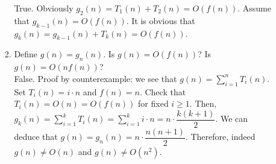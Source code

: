 \documentclass[11pt]{article}
\begin{document}
\begin{enumerate}
\begin{enumerate}
\begin{enumerate}
True. Obviously $g_2 (n) = T_1 (n) + T_2 (n) = O(f(n))$. Assume that $g_{k-1} (n) = O(f(n))$. It is obvious that $g_{k} (n) = g_{k-1} (n) + T_{k} (n) = O(f(n))$.
\item Define $g(n) = g_n (n)$. Is $g(n) = O(f(n))$? Is $g(n) = O(nf(n))$?\\
False. Proof by counterexample: we see that $g(n) = \sum_{i=1}^{n} T_i (n)$. Set $T_i (n) = i \cdot n$ and $f(n) = n$. Check that $T_i (n) = O(n) = O(f(n))$ for fixed $i \geq 1$. Then, $g_k (n) = \sum_{i=1}^{k} T_i (n) = \sum_{i=1}^{k} i \cdot n = n \cdot \dfrac{k(k+1)}{2}$. We can deduce that $g(n) = g_n (n) = n \cdot \dfrac{n(n+1)}{2}$. Therefore, indeed $g(n) \neq O(n)$ and $g(n) \neq O(n^2)$. 
\end{enumerate}
\end{enumerate}
\end{enumerate}
\end{document}
